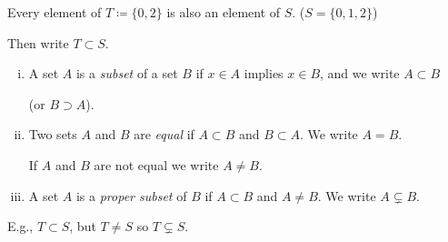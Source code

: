 \documentclass[10pt,aspectratio=149]{beamer}
\begin{document}
\begin{frame}
Every element of $T \coloneqq \{ 0 , 2 \}$ is also an element of $S$.
\quad($S=\{0,1,2\}$)

\medskip
\pause

Then write $T \subset S$.

\hspace*{1.6in}{sets.pdf_t}

\pause

\begin{definition}
\leavevmode
\begin{enumerate}[(i)]
\item
A set $A$ is a \emph{subset}
of a set $B$ if $x \in A$ implies $x \in B$, and we write $A \subset B$

(or
$B \supset A$).
\item \pause
Two sets $A$ and $B$ are \emph{equal} if $A \subset B$ and $B
\subset A$.  We write $A = B$.

If $A$ and $B$ are not equal we write $A \not= B$.
\item \pause
A set $A$ is a \emph{proper subset} of $B$ if $A \subset B$
and $A \not= B$.  We write $A \subsetneq B$.
\end{enumerate}
\end{definition}

\pause
E.g., $T \subset S$, but $T \not= S$ so $T \subsetneq S$.
\end{frame}
\end{document}
